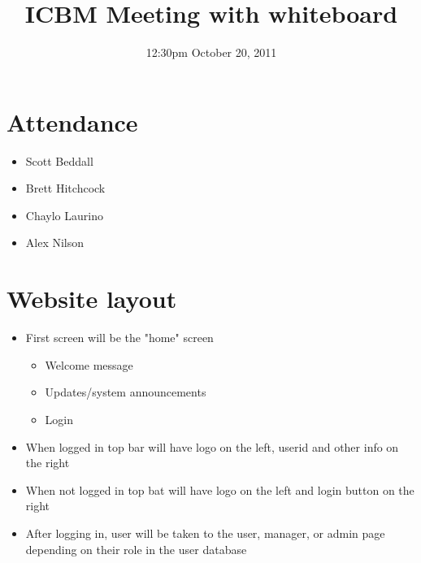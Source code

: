 \documentclass{article}
\begin{document}
\title{ICBM Meeting with whiteboard}
\date{12:30pm October 20, 2011}
\maketitle

\section{Attendance}
\begin{itemize}
\item Scott Beddall
\item Brett Hitchcock
\item Chaylo Laurino
\item Alex Nilson
\end{itemize}

\section{Website layout}
\begin{itemize}
\item First screen will be the "home" screen
	\begin{itemize}
	\item Welcome message
	\item Updates/system announcements
	\item Login
	\end{itemize}
\item When logged in top bar will have logo on the left, userid and other info on the right
\item When not logged in top bat will have logo on the left and login button on the right
\item After logging in, user will be taken to the user, manager, or admin page depending on their  role in the user database
\end{itemize}
\end{document}
